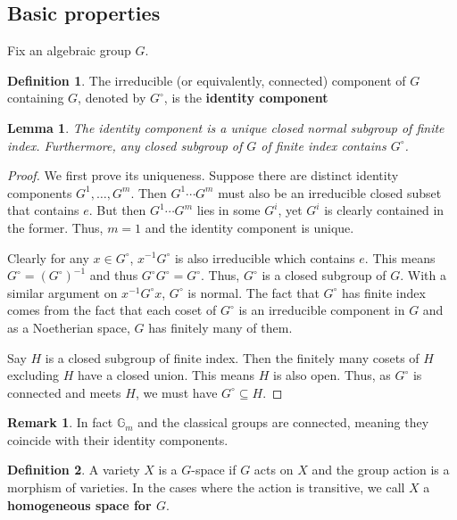 \documentclass[12pt]{report}
\newtheorem{lemma}{Lemma}[section]
\theoremstyle{remark}
\theoremstyle{definition}
\newtheorem{remark}{Remark}[section]
\newtheorem{definition}{Definition}[section]
\newcommand{\G}[0]{\mathbb{G}}
\begin{document}
    \subsection{Basic properties}
    Fix an algebraic group $G$.
    \begin{definition}
        The irreducible (or equivalently, connected) component of $G$ containing $G$, denoted by $G^\circ$, is the \textbf{identity component}
    \end{definition}
    \begin{lemma}
        The identity component is a unique closed normal subgroup of finite index. Furthermore, any closed subgroup of $G$ of finite index contains $G^\circ$.
    \end{lemma}
    \begin{proof}
        We first prove its uniqueness. Suppose there are distinct identity components $G^1,\dots, G^m$. Then $G^1\cdots G^m$ must also be an irreducible closed subset that contains $e$. But then $G^1\cdots G^m$ lies in some $G^i$, yet $G^i$ is clearly contained in the former. Thus, $m=1$ and the identity component is unique.

        Clearly for any $x\in G^\circ$, $x^{-1}G^\circ$ is also irreducible which contains $e$. This means $G^\circ=(G^\circ)^{-1}$ and thus $G^\circ G^\circ=G^\circ$. Thus, $G^\circ$ is a closed subgroup of $G$. With a similar argument on $x^{-1}G^\circ x$, $G^\circ$ is normal. The fact that $G^\circ$ has finite index comes from the fact that each coset of $G^\circ$ is an irreducible component in $G$ and as a Noetherian space, $G$ has finitely many of them.

        Say $H$ is a closed subgroup of finite index. Then the finitely many cosets of $H$ excluding $H$ have a closed union. This means $H$ is also open. Thus, as $G^\circ$ is connected and meets $H$, we must have $G^\circ \subseteq H$.
    \end{proof}
    \begin{remark}
        In fact $\G_m$ and the classical groups are connected, meaning they coincide with their identity components.
    \end{remark}
    \begin{definition}
        A variety $X$ is a $G$-space if $G$ acts on $X$ and the group action is a morphism of varieties. In the cases where the action is transitive, we call $X$ a \textbf{homogeneous space for $G$}.
    \end{definition}
\end{document}
